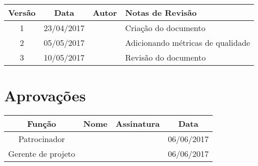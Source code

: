 \begin{table}[H]
	\begin{tabularx}{\textwidth}{| c | c | X | X |}
		\hline
		\textbf{Versão} & \textbf{Data} & \textbf{Autor}        & \textbf{Notas de Revisão}         \\
		\hline
		1                & 23/04/2017    & \projectManagerName{} & Criação do documento             \\
		\hline
		2                & 05/05/2017    & \projectManagerName{} & Adicionando métricas de qualidade \\
		\hline
		3                & 10/05/2017    & \projectManagerName{} & Revisão do documento              \\
		\hline
	\end{tabularx}
	\centering
\end{table}

\section{Aprovações}

\begin{table}[H]
	\begin{tabularx}{\textwidth}{| c | c | X | c |}
		\hline
		\textbf{Função}  & \textbf{Nome}         & \textbf{Assinatura}        & \textbf{Data} \\
		\hline
		Patrocinador       & \projectSponsorName{} & \projectSponsorSignature{} & 06/06/2017    \\
		\hline
		Gerente de projeto & \projectManagerName{} & \projectManagerSignature{} & 06/06/2017    \\
		\hline
	\end{tabularx}
	\centering
\end{table}